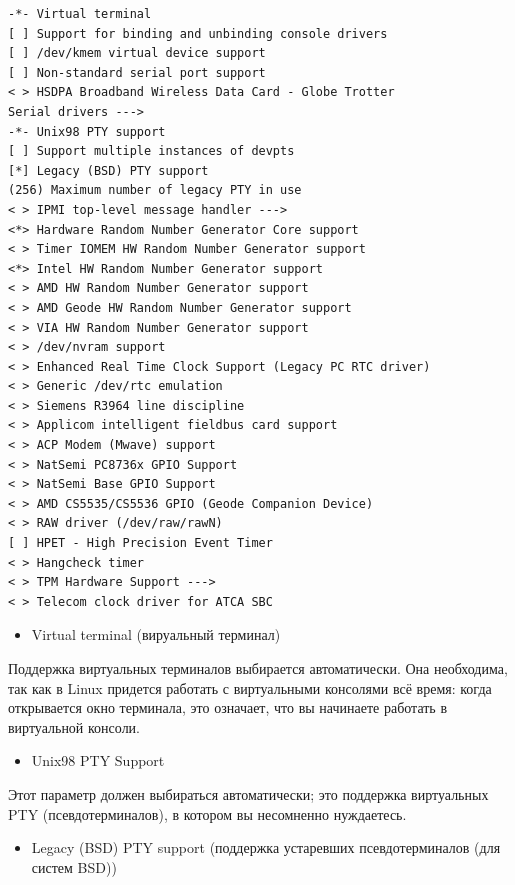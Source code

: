 \documentclass[10pt]{book}
\begin{document}
\vspace{3mm}
\begin{tcolorbox}[colback=gray!14!white, colframe=blue!75!blue]
\begin{lstlisting}
-*- Virtual terminal
[ ] Support for binding and unbinding console drivers
[ ] /dev/kmem virtual device support
[ ] Non-standard serial port support
< > HSDPA Broadband Wireless Data Card - Globe Trotter
Serial drivers --->
-*- Unix98 PTY support
[ ] Support multiple instances of devpts
[*] Legacy (BSD) PTY support
(256) Maximum number of legacy PTY in use
< > IPMI top-level message handler --->
<*> Hardware Random Number Generator Core support
< > Timer IOMEM HW Random Number Generator support
<*> Intel HW Random Number Generator support
< > AMD HW Random Number Generator support
< > AMD Geode HW Random Number Generator support
< > VIA HW Random Number Generator support
< > /dev/nvram support
< > Enhanced Real Time Clock Support (Legacy PC RTC driver)
< > Generic /dev/rtc emulation
< > Siemens R3964 line discipline
< > Applicom intelligent fieldbus card support
< > ACP Modem (Mwave) support
< > NatSemi PC8736x GPIO Support
< > NatSemi Base GPIO Support
< > AMD CS5535/CS5536 GPIO (Geode Companion Device)
< > RAW driver (/dev/raw/rawN)
[ ] HPET - High Precision Event Timer
< > Hangcheck timer
< > TPM Hardware Support --->
< > Telecom clock driver for ATCA SBC
\end{lstlisting}
\end{tcolorbox}

\begin{itemize}
\item Virtual terminal (вируальный терминал)
\end{itemize}

Поддержка виртуальных терминалов выбирается автоматически. Она необходима, так как в Linux придется работать с виртуальными консолями всё время: когда открывается окно терминала, это означает, что вы начинаете работать в виртуальной консоли.

\begin{itemize}
\item Unix98 PTY Support
\end{itemize}

Этот параметр должен выбираться автоматически; это поддержка виртуальных PTY (псевдотерминалов), в котором вы несомненно нуждаетесь.

\begin{itemize}
\item Legacy (BSD) PTY support (поддержка устаревших псевдотерминалов (для систем BSD)) 
\end{itemize}
\end{document}
